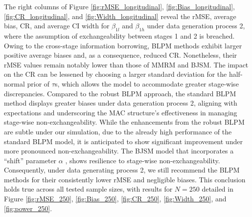 The right columns of Figure \ref{fig:rMSE_longitudinal}, \ref{fig:Bias_longitudinal}, \ref{fig:CR_longitudinal}, and \ref{fig:Width_longitudinal} reveal the \ac{rMSE}, average bias, \ac{CR}, and average \ac{CI} width for $\beta_{1l}$ and $\beta_{1h}$ under data generation process 2, where the assumption of exchangeability between stages 1 and 2 is breached. Owing to the cross-stage information borrowing, \ac{BLPM} methods exhibit larger positive average biases and, as a consequence, reduced \ac{CR}. Nonetheless, their \ac{rMSE} values remain notably lower than those of \ac{MMRM} and \ac{BJSM}. The impact on the \ac{CR} can be lessened by choosing a larger standard deviation for the half-normal prior of $\tau$s, which allows the model to accommodate greater stage-wise discrepancies. Compared to the robust \ac{BLPM} approach, the standard \ac{BLPM} method displays greater biases under data generation process 2, aligning with expectations and underscoring the \ac{MAC} structure's effectiveness in managing stage-wise non-exchangeability. While the enhancements from the robust \ac{BLPM} are subtle under our simulation, due to the already high performance of the standard \ac{BLPM} model, it is anticipated to show significant improvement under more pronounced non-exchangeability. The \ac{BJSM} model that incorporates a ``shift” parameter $\alpha$ \citep{fang2023comparing}, shows resilience to stage-wise non-exchangeability. Consequently, under data generating process 2, we still recommend the \ac{BLPM} methods for their consistently lower \ac{rMSE} and negligible biases. This conclusion holds true across all tested sample sizes, with results for $N = 250$ detailed in Figure \ref{fig:rMSE_250}, \ref{fig:Bias_250}, \ref{fig:CR_250}, \ref{fig:Width_250}, and \ref{fig:power_250}.

